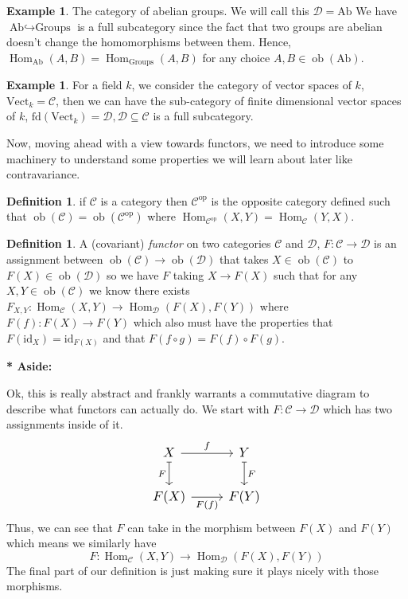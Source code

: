 \documentclass[11pt,a4paper]{article}
\DeclareMathOperator{\Hom}{Hom}
\newcommand{\Cat}{\mathcal{C}}
\newcommand{\CatD}{\mathcal{D}}
\DeclareMathOperator{\ob}{ob}
\newcommand{\Vect}{\text{Vect}}
\newenvironment{asidebar}{%
    \def\FrameCommand{\vrule width 1.5pt \hspace{8pt}}%
    \MakeFramed{\advance\hsize-\width\FrameRestore}%
}{\endMakeFramed}
\newenvironment{aside}{%
    \begin{asidebar}\noindent\textbf{* Aside:}\enspace
}{\end{asidebar}}
\theoremstyle{plain}
\theoremstyle{definition}
\newtheorem{definition}[theorem]{Definition}
\newtheorem{example}[theorem]{Example}
\theoremstyle{remark}
\begin{document}
\begin{example}
    The category of abelian groups. We will call this $\CatD = \text{Ab}$ We have $\text{Ab} \hookrightarrow \text{Groups}$ is a full subcategory since the fact that two groups are abelian doesn't change the homomorphisms between them. Hence, $\Hom_\text{Ab}(A,B) = \Hom_\text{Groups}(A,B)$ for any choice $A,B \in \ob(\text{Ab})$.
\end{example}

\begin{example}
    For a field $k$, we consider the category of vector spaces of $k$, $\Vect_k = \Cat$, then we can have the sub-category of finite dimensional vector spaces of $k$, $\text{fd}(\Vect_k) = \CatD, \CatD \subseteq \Cat$ is a full subcategory.
\end{example}

\noindent
Now, moving ahead with a view towards functors, we need to introduce some machinery to understand some properties we will learn about later like contravariance. 

\begin{definition}
    if $\Cat$ is a category then $\Cat^\text{op}$ is the opposite category defined such that $\ob(\Cat) = \ob(\Cat^\text{op})$ where $\Hom_{\Cat^\text{op}}(X,Y) = \Hom_\Cat(Y,X)$.
\end{definition}

\begin{definition}
    A (covariant) \emph{functor} on two categories $\Cat$ and $\CatD$, $F: \Cat \to \CatD$ is an assignment between $\ob(\Cat) \to \ob(\CatD)$ that takes $X \in \ob(\Cat)$ to  $F(X) \in \ob(\CatD)$ so we have $F$ taking $X \to F(X)$ such that for any $X,Y \in \ob(\Cat)$ we know there exists $F_{X,Y}: \Hom_\Cat(X,Y) \to \Hom_\CatD(F(X),F(Y))$ where $F(f):F(X) \to F(Y)$ which also must have the properties that $F(\text{id}_X) = \text{id}_{F(X)}$ and that $F(f \circ g) = F(f) \circ F(g)$.
\end{definition}

\begin{aside}
Ok, this is really abstract and frankly warrants a commutative diagram to describe what functors can actually do. We start with $F: \Cat \to \CatD$ which has two assignments inside of it.
\[
\scalebox{1.2}{
\begin{tikzcd}[ampersand replacement=\&]
X \arrow[r, "f"] \arrow[d, mapsto, "F"'] \&
Y \arrow[d, mapsto, "F"] \\
F(X) \arrow[r, "F(f)"'] \&
F(Y)
\end{tikzcd}
}
\]
Thus, we can see that $F$ can take in the morphism between $F(X)$ and $F(Y)$ which means we similarly have $$F: \Hom_\Cat(X,Y) \to \Hom_\CatD(F(X),F(Y))$$ The final part of our definition is just making sure it plays nicely with those morphisms.
\end{aside}
\end{document}
